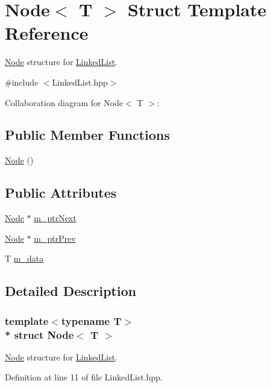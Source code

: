 \hypertarget{structNode}{}\section{Node$<$ T $>$ Struct Template Reference}
\label{structNode}


\hyperlink{structNode}{Node} structure for \hyperlink{classLinkedList}{Linked\+List}.  




{\ttfamily \#include $<$Linked\+List.\+hpp$>$}



Collaboration diagram for Node$<$ T $>$\+:
\subsection*{Public Member Functions}
\begin{DoxyCompactItemize}
\item 
\hyperlink{structNode_a0ac1d44cfe588be564acf25485029bd8}{Node} ()
\end{DoxyCompactItemize}
\subsection*{Public Attributes}
\begin{DoxyCompactItemize}
\item 
\hyperlink{structNode}{Node} $\ast$ \hyperlink{structNode_a36826cd3138b5c317fb16ccefea0d9e6}{m\+\_\+ptr\+Next}
\item 
\hyperlink{structNode}{Node} $\ast$ \hyperlink{structNode_a4ac5c4812b8d0131789509c89d192ac5}{m\+\_\+ptr\+Prev}
\item 
T \hyperlink{structNode_a392c71799aaa644ca5c63e5413769730}{m\+\_\+data}
\end{DoxyCompactItemize}


\subsection{Detailed Description}
\subsubsection*{template$<$typename T$>$\\*
struct Node$<$ T $>$}

\hyperlink{structNode}{Node} structure for \hyperlink{classLinkedList}{Linked\+List}. 

Definition at line 11 of file Linked\+List.\+hpp.



